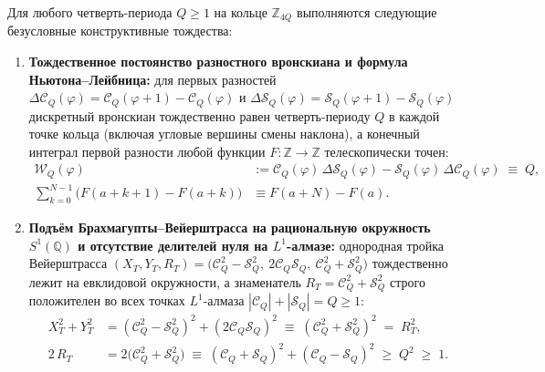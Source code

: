 \begin{theorem}
\label{thm:math-wronskian-weierstrass-quadratures}
\leanok
Для любого четверть-периода $Q \ge 1$ на кольце $\mathbb{Z}_{4Q}$ выполняются следующие безусловные конструктивные тождества:
\begin{enumerate}[label=\textbf{(\arabic*)},leftmargin=*]
\item \textbf{Тождественное постоянство разностного вронскиана и формула Ньютона--Лейбница:}
  для первых разностей $\Delta\mathcal{C}_Q(\varphi) = \mathcal{C}_Q(\varphi+1) - \mathcal{C}_Q(\varphi)$ и $\Delta\mathcal{S}_Q(\varphi) = \mathcal{S}_Q(\varphi+1) - \mathcal{S}_Q(\varphi)$ дискретный вронскиан тождественно равен четверть-периоду $Q$ в каждой точке кольца (включая угловые вершины смены наклона), а конечный интеграл первой разности любой функции $F : \mathbb{Z} \to \mathbb{Z}$ телескопически точен:
  \begin{align}
    \mathcal{W}_Q(\varphi) &:= \mathcal{C}_Q(\varphi)\,\Delta\mathcal{S}_Q(\varphi) - \mathcal{S}_Q(\varphi)\,\Delta\mathcal{C}_Q(\varphi) \;\equiv\; Q, \label{eq:math-const-wronskian} \\
    \sum_{k=0}^{N-1} \bigl(F(a + k + 1) - F(a + k)\bigr) &\equiv F(a + N) - F(a). \label{eq:math-newton-leibniz}
  \end{align}
\item \textbf{Подъём Брахмагупты--Вейерштрасса на рациональную окружность $S^1(\mathbb{Q})$ и отсутствие делителей нуля на $L^1$-алмазе:}
  однородная тройка Вейерштрасса $(X_T, Y_T, R_T) = \bigl(\mathcal{C}_Q^2 - \mathcal{S}_Q^2,\ 2\mathcal{C}_Q\mathcal{S}_Q,\ \mathcal{C}_Q^2 + \mathcal{S}_Q^2\bigr)$ тождественно лежит на евклидовой окружности, а знаменатель $R_T = \mathcal{C}_Q^2 + \mathcal{S}_Q^2$ строго положителен во всех точках $L^1$-алмаза $|\mathcal{C}_Q| + |\mathcal{S}_Q| = Q \ge 1$:
  \begin{align}
    X_T^2 + Y_T^2 &= (\mathcal{C}_Q^2 - \mathcal{S}_Q^2)^2 + (2\mathcal{C}_Q\mathcal{S}_Q)^2 \;\equiv\; (\mathcal{C}_Q^2 + \mathcal{S}_Q^2)^2 \;=\; R_T^2, \label{eq:math-weierstrass-circle} \\
    2\,R_T &= 2\bigl(\mathcal{C}_Q^2 + \mathcal{S}_Q^2\bigr) \;\equiv\; (\mathcal{C}_Q + \mathcal{S}_Q)^2 + (\mathcal{C}_Q - \mathcal{S}_Q)^2 \;\ge\; Q^2 \;\ge\; 1. \label{eq:math-no-zero-divisors}

\end{align}
\end{enumerate}
\end{theorem}
